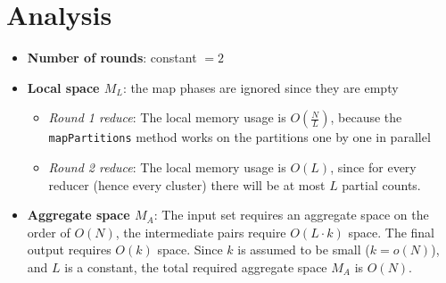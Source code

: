 \documentclass[11pt,letterpaper, onecolumn]{exam}
\begin{document}
\section{Analysis}
\begin{itemize}
    \item \textbf{Number of rounds}: constant $= 2$
    \item \textbf{Local space $M_L$}:
    the map phases are ignored since they are empty
    \begin{itemize}
        \item \textit{Round 1 reduce}: The local memory usage is $O(\frac{N}{L})$, because the \texttt{mapPartitions} method works on the partitions one by one in parallel
        \item \textit{Round 2 reduce}: The local memory usage is $O(L)$, since for every reducer (hence every cluster) there will be at most $L$ partial counts.
    \end{itemize}
    \item \textbf{Aggregate space $M_A$}: The input set requires an aggregate space on the order of $O(N)$, the intermediate pairs require $O(L \cdot k)$ space. The final output requires $O(k)$ space. Since $k$ is assumed to be small ($k = o(N)$), and $L$ is a constant, the total required aggregate space $M_A$ is $O(N)$.
\end{itemize}
\end{document}
